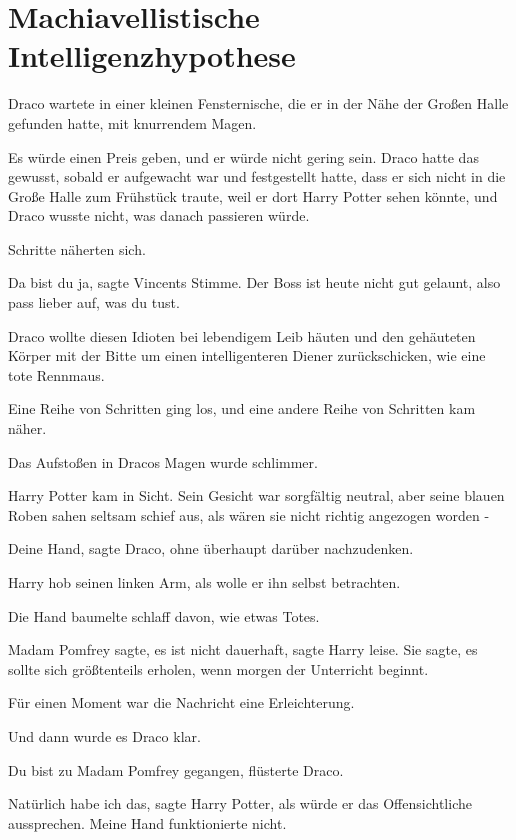 \chapter{Machiavellistische Intelligenzhypothese}

Draco wartete in einer kleinen Fensternische, die er in der Nähe der Großen
Halle gefunden hatte, mit knurrendem Magen.

Es würde einen Preis geben, und er würde nicht gering sein. Draco hatte das
gewusst, sobald er aufgewacht war und festgestellt hatte, dass er sich nicht in
die Große Halle zum Frühstück traute, weil er dort Harry Potter sehen könnte,
und Draco wusste nicht, was danach passieren würde.

Schritte näherten sich.

\glqq{}Da bist du ja\grqq{}, sagte Vincents Stimme. \glqq{}Der Boss ist heute
nicht gut gelaunt, also pass lieber auf, was du tust.\grqq{}

Draco wollte diesen Idioten bei lebendigem Leib häuten und den gehäuteten Körper
mit der Bitte um einen intelligenteren Diener zurückschicken, wie eine tote
Rennmaus.

Eine Reihe von Schritten ging los, und eine andere Reihe von Schritten kam
näher.

Das Aufstoßen in Dracos Magen wurde schlimmer.

Harry Potter kam in Sicht. Sein Gesicht war sorgfältig neutral, aber seine
blauen Roben sahen seltsam schief aus, als wären sie nicht richtig angezogen
worden -

\glqq{}Deine Hand\grqq{}, sagte Draco, ohne überhaupt darüber nachzudenken.

Harry hob seinen linken Arm, als wolle er ihn selbst betrachten.

Die Hand baumelte schlaff davon, wie etwas Totes.

\glqq{}Madam Pomfrey sagte, es ist nicht dauerhaft\grqq{}, sagte Harry leise.
\glqq{}Sie sagte, es sollte sich größtenteils erholen, wenn morgen der
Unterricht beginnt.\grqq{}

Für einen Moment war die Nachricht eine Erleichterung.

Und dann wurde es Draco klar.

\glqq{}Du bist zu Madam Pomfrey gegangen\grqq{}, flüsterte Draco.

\glqq{}Natürlich habe ich das\grqq{}, sagte Harry Potter, als würde er das
Offensichtliche aussprechen. \glqq{}Meine Hand funktionierte nicht.\grqq{}

